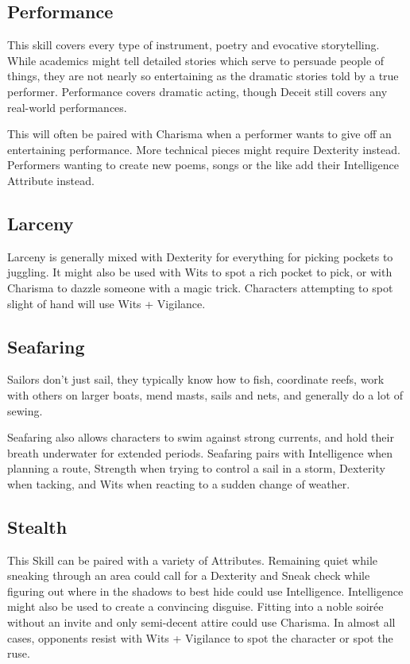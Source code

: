 \begin{multicols}{2}
\subsection{Performance}

This skill covers every type of instrument, poetry and evocative storytelling. While academics might tell detailed stories which serve to persuade people of things, they are not nearly so entertaining as the dramatic stories told by a true performer. Performance covers dramatic acting, though Deceit still covers any real-world performances.

This will often be paired with Charisma when a performer wants to give off an entertaining performance. More technical pieces might require Dexterity instead. Performers wanting to create new poems, songs or the like add their Intelligence Attribute instead.

\subsection{Larceny}

Larceny is generally mixed with Dexterity for everything for picking pockets to juggling.
It might also be used with Wits to spot a rich pocket to pick, or with Charisma to dazzle someone with a magic trick.
Characters attempting to spot slight of hand will use Wits + Vigilance.

\subsection{Seafaring}

Sailors don't just sail, they typically know how to fish, coordinate reefs, work with others on larger boats, mend masts, sails and nets, and generally do a lot of sewing.

Seafaring also allows characters to swim against strong currents, and hold their breath underwater for extended periods.
Seafaring pairs with Intelligence when planning a route, Strength when trying to control a sail in a storm, Dexterity when tacking, and Wits when reacting to a sudden change of weather.

\subsection{Stealth}

This Skill can be paired with a variety of Attributes.
Remaining quiet while sneaking through an area could call for a Dexterity and Sneak check while figuring out where in the shadows to best hide could use Intelligence.
Intelligence might also be used to create a convincing disguise.
Fitting into a noble soir\'{e}e without an invite and only semi-decent attire could use Charisma.
In almost all cases, opponents resist with Wits + Vigilance to spot the character or spot the ruse.


\end{multicols}
